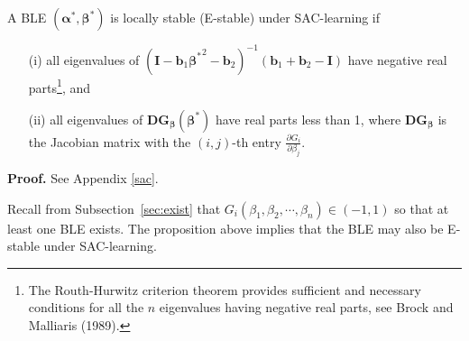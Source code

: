\begin{prop}
\label{prop:stab} A BLE $(\pmb\alpha^*,{\pmb\beta}^*)$ is locally
stable (E-stable) under SAC-learning if
\begin{enumerate}
\item[(i)] all eigenvalues of $({\pmb I}-{\pmb b_1}{{\pmb \beta}^*}^2-{\pmb b}_2)^{-1}({\pmb b}_1+{\pmb b}_2-{\pmb I})$ have negative real parts\footnote{The  Routh-Hurwitz criterion theorem provides sufficient and necessary conditions for all the $n$ eigenvalues having negative real parts, see Brock and Malliaris (1989). }, and
\item[(ii)] all eigenvalues of ${\pmb D}{\pmb G}_{\pmb\beta}(\pmb\beta^*)$ have real parts less than 1, where ${\pmb D}{\pmb G}_{\pmb\beta}$ is the Jacobian matrix with the $(i,j)$-th entry $\frac{\partial G_i}{\partial\beta_j}$.
\end{enumerate}
\end{prop}
\textbf{Proof.} See Appendix \ref{sac}.

Recall from Subsection~\ref{sec:exist} that $G_i(\beta_1,\beta_2,\cdots,\beta_n)\in(-1,1)$ so that at least one BLE exists. The proposition above implies that the BLE may also be E-stable under SAC-learning.
